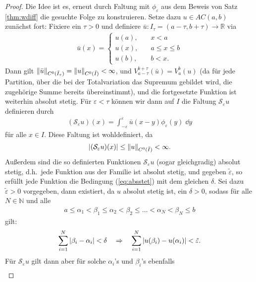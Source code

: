 \documentclass[twoside]{article}
\theoremstyle{definition}
\newcommand{\calS}{\mathcal{S}}
\newcommand{\R}{\mathbb{R}}
\newcommand{\N}{\mathbb{N}}
\begin{document}
\begin{proof}
Die Idee ist es, erneut durch Faltung mit $\phi_\varepsilon$ aus dem Beweis von Satz \ref{thm:wdiff} die gesuchte Folge zu konstruieren. Setze dazu $u \in AC(a,b)$ zunächst fort: Fixiere ein $\tau > 0$ und definiere $\bar{u}: I_\tau =(a - \tau, b + \tau) \to \R$ via 
\begin{align*}
\bar{u}(x) = \begin{cases}
u(a), \quad & x < a\\
u(x), \quad & a \leq x \leq b\\
u(b), \quad & b < x.
\end{cases}
\end{align*}
Dann gilt $\norm{\bar{u}}_{C^0(\bar{I}_\tau)} = \norm{u}_{C^0(\bar {I})} < \infty$, und $V^{b + \tau}_{a - \tau}(\bar{u}) = V^b_a(u)$ (da für jede Partition, über die bei der Totalvariation das Supremum gebildet wird, die zugehörige Summe bereits übereinstimmt), und die fortgesetzte Funktion ist weiterhin absolut stetig. Für $\varepsilon < \tau$ können wir dann auf $I$ die Faltung $\calS_\varepsilon u$ definieren durch
\begin{align*}
(\calS_\varepsilon u)(x) = \int_{- \varepsilon}^\varepsilon \bar{u}(x-y) \phi_\varepsilon(y) \; \dd y
\end{align*}
für alle $x \in I$. Diese Faltung ist wohldefiniert, da
\begin{align*}
\abs{(\calS_\varepsilon u)(x)} \leq \norm{u}_{C^0(\bar{I})} < \infty.
\end{align*}
Außerdem sind die so definierten Funktionen $\calS_\varepsilon u$ (sogar gleichgradig) absolut stetig, d.h.\ jede Funktion aus der Familie ist absolut stetig, und gegeben $\tilde{\varepsilon}$, so erfüllt jede Funktion die Bedingung (\ref{eq:absstet}) mit dem gleichen $\delta$. Sei dazu $\tilde{\varepsilon} > 0$ vorgegeben, dann existiert, da $u$ absolut stetig ist, ein $\delta > 0$, sodass für alle $N \in \N$ und alle
\begin{align*}
a \leq \alpha_1 < \beta_1 \leq \alpha_2 < \beta_2 \leq \dots < \alpha_N < \beta_N \leq b
\end{align*}
gilt:
\begin{align*}
\sum_{i=1}^N \abs{\beta_i - \alpha_i}< \delta \quad \Rightarrow \quad \sum_{i=1}^N \abs{u(\beta_i) - u(\alpha_i)} < \tilde{\varepsilon}.
\end{align*}
Für $\calS_\varepsilon u$ gilt dann aber für solche $\alpha_i$'s und $\beta_i$'s ebenfalls
\begin{align*}

\end{align*}
\end{proof}
\end{document}
